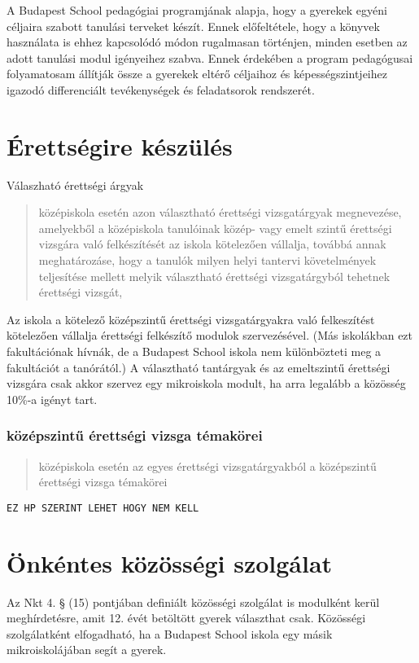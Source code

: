 A Budapest School pedagógiai programjának alapja, hogy a gyerekek egyéni
céljaira szabott tanulási terveket készít. Ennek előfeltétele, hogy a
könyvek használata is ehhez kapcsolódó módon rugalmasan történjen,
minden esetben az adott tanulási modul igényeihez szabva. Ennek
érdekében a program pedagógusai folyamatosam állítják össze a gyerekek
eltérő céljaihoz és képességszintjeihez igazodó differenciált
tevékenységek és feladatsorok rendszerét.

\section{Érettségire készülés }
Válaszható érettségi árgyak
\begin{quote}
      középiskola esetén azon választható érettségi vizsgatárgyak megnevezése,
      amelyekből a középiskola tanulóinak közép- vagy emelt szintű érettségi
      vizsgára való felkészítését az iskola kötelezően vállalja, továbbá annak
      meghatározáse, hogy a tanulók milyen helyi tantervi követelmények
      teljesítése mellett melyik választható érettségi vizsgatárgyból tehetnek
      érettségi vizsgát,
\end{quote}

Az iskola a kötelező középszintű érettségi vizsgatárgyakra való
felkeszítést kötelezően vállalja érettségi felkészítő modulok
szervezésével. (Más iskolákban ezt fakultációnak hívnák, de a Budapest
School iskola nem különbözteti meg a fakultációt a tanórától.) A
választható tantárgyak és az emeltszintű érettségi vizsgára csak akkor
szervez egy mikroiskola modult, ha arra legalább a közösség 10\%-a
igényt tart.

\subsubsection{középszintű érettségi vizsga témakörei}

\begin{quote}
      középiskola esetén az egyes érettségi vizsgatárgyakból a középszintű
      érettségi vizsga témakörei
\end{quote}

\texttt{EZ\ HP\ SZERINT\ LEHET\ HOGY\ NEM\ KELL}

\section{Önkéntes közösségi
  szolgálat}\label{uxf6nkuxe9ntes-kuxf6zuxf6ssuxe9gi-szolguxe1lat}

Az Nkt 4. § (15) pontjában definiált közösségi szolgálat is modulként
kerül meghírdetésre, amit 12. évét betöltött gyerek választhat csak.
Közösségi szolgálatként elfogadható, ha a Budapest School iskola egy
másik mikroiskolájában segít a gyerek.
